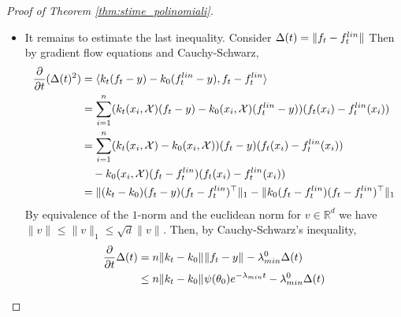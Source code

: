 \documentclass[10pt,a4paper]{amsart}
\newcommand{\R}{\mathbb{R}}
\newcommand{\X}{\mathcal{X}}
\newcommand{\lammin}{\lambda_{\textup{min}}}
\newcommand{\lin}{{\textup{lin}}}
\newcommand{\norm}[2]{
    \|#1\|_{#2}
}
\newcommand{\partv}[1]{
    \frac{\partial}{\partial #1}
}
\newcommand{\s}{\psi}
\begin{document}
\begin{proof}[Proof of Theorem \ref{thm:stime_polinomiali}]
\begin{itemize}
    Hence, \eqref{eqaux_flin} can be written as:
    \begin{align}
        \label{eqaux_3rdsum} \norm{f^\lin-\overline y_t}{}^2 &\le \frac{B_0}{n_1n_0}\norm{\theta_0^{(0)}\theta_0^{(1)} }{}^2 + \frac{B_1}{n_1^2n_0^2}\norm{\theta_0^{(0)}\theta_0^{(1)} }{}^2\s(\theta_0)^4t^4\\
        &\quad +\frac{B_2}{n_1^2n_0^2}\norm{\theta_0^{(0)}}{}^2\norm{\theta_0^{(1)} }{}^4\s(\theta_0)^2t^2+\frac{B_3}{n_1n_0^2}\norm{\theta_0^{(0)}\theta_0^{(1)} }{}^2\s(\theta_0)^2 t^2\\
        &\quad +\frac{B_4}{n_1^2n_0}\norm{\theta_0^{(1)} }{}^2\s(\theta_0)^4t^4+\frac{B_5}{n_1^2n_0}\norm{\theta_0^{(1)} }{}^4\s(\theta_0)^2t^2 \\
        &\quad +\frac{B_6}{n_1n_0}\norm{\theta_0^{(1)} }{}^2\s(\theta_0)^2t^2+\frac{B_7}{n_1^2n_0}\norm{\theta_0^{(0)} }{}^2\s(\theta_0)^4t^4 \\
        &\quad +\frac{B_8}{n_1^2n_0}\norm{\theta_0^{(0)} }{}^2\norm{\theta_0^{(1)} }{}^2\s(\theta_0)^2t^2+\frac{B_9}{n_1n_0}\norm{\theta_0^{(0)} }{}^2\s(\theta_0)^2t^2,
    \end{align}
    where the constants in the last inequality are, explicitly, $B_0=2A_0$,
    $B_1=8(\textup{Lip}\Phi'\norm{\X}{}\norm{x-\X}{}a_0)^2$,
    $B_2=8(\textup{Lip}\Phi'\norm{\X}{}\norm{x-\X}{}a'_0)^2$,
    $B_3=4(\textup{Lip}\Phi'\norm{\X}{}\norm{x-\X}{}a_1)^2$,
    $B_4=8(\norm{\Phi'}{\infty}\norm{x-\X}{}a_0)^2$,
    $B_5=8(\norm{\Phi'}{\infty}\norm{x-\X}{}a'_0)^2$,
    $B_6=4(\norm{\Phi'}{\infty}\norm{x-\X}{}a_1)^2$,
    $B_7=4A_0a_0^2$,
    $B_8=4A_0{a'}_0^2$, and $B_9 = 2A_0a_1^2$.

    \item It remains to estimate the last inequality.
        Consider $\Delta(t) = \norm{f_t - f_t^\lin}{}$
        Then by gradient flow equations and Cauchy-Schwarz,
        \begin{align}
            \partv{t}(\Delta(t)^2) & = \langle k_t(f_t-y) -k_0(f_t^\lin-y), f_t - f_t^\lin \rangle \\
            &= \sum_{i=1}^n (k_t(x_i,\X)(f_t-y) -k_0(x_i,\X)(f_t^\lin-y))(f_t(x_i) - f_t^\lin(x_i))\\
            &= \sum_{i=1}^n (k_t(x_i,\X)-k_0(x_i,\X))(f_t-y)(f_t(x_i) - f_t^\lin(x_i)) \\
            &\quad -k_0(x_i,\X)(f_t - f_t^\lin)(f_t(x_i) - f_t^\lin(x_i))\\
            &=\norm{(k_t-k_0)(f_t-y)(f_t-f_t^\lin)^\top}{1} - \norm{k_0(f_t-f_t^\lin)(f_t-f_t^\lin)^\top}{1}
        \end{align}
        By equivalence of the $1$-norm and the euclidean norm for $v\in \R^d$ we have $\norm{v}{} \le \norm{v}{1} \le \sqrt{d}\norm{v}{}$.
        Then, by Cauchy-Schwarz's inequality,
        \begin{align}
            \frac{\partial}{\partial t} \Delta(t) &= n\norm{k_t-k_0}{}\norm{f_t-y}{} -\lammin^0\Delta(t) \\
            &\label{eqaux_delta} \le n\norm{k_t-k_0}{}\s(\theta_0)e^{-\lammin t} -\lammin^0\Delta(t)
        \end{align}


\end{itemize}
\end{proof}
\end{document}
